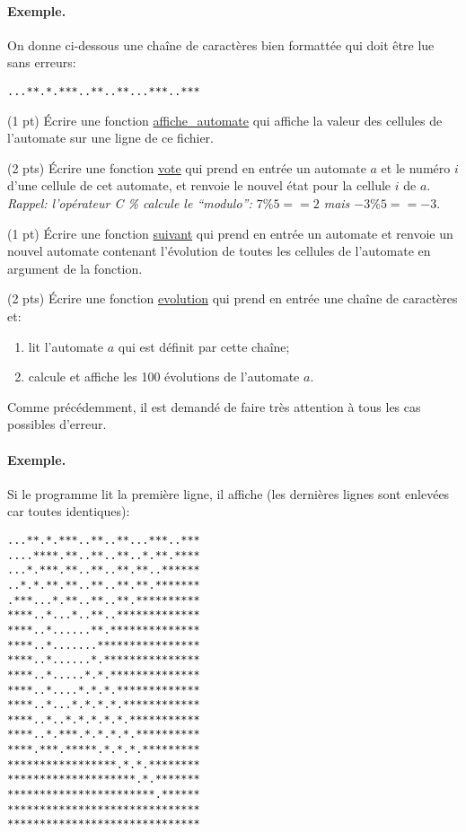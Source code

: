 \paragraph{Exemple.} On donne ci-dessous une chaîne de caractères bien
formatt{\'e}e qui doit {\^e}tre lue sans erreurs:
\begin{verbatim}
...**.*.***..**..**...***..***
\end{verbatim}

\question (1 pt) {\'E}crire une fonction \url{affiche_automate} qui
affiche la valeur des cellules de l'automate sur une ligne de ce fichier.


\question (2 pts) {\'E}crire une fonction \url{vote} qui prend en entr{\'e}e
un automate $a$ et le num{\'e}ro $i$ d'une cellule de cet automate, et
renvoie le nouvel {\'e}tat pour la cellule $i$ de $a$. \textit{Rappel: 
l'op{\'e}rateur C \% calcule le ``modulo'': $7\% 5 == 2$  mais \(-3 \% 5 == -3\)}.


\question (1 pt) {\'E}crire une fonction \url{suivant} qui prend en
entr{\'e}e un automate et renvoie un nouvel automate contenant
l'évolution de toutes les cellules de l'automate en argument de la fonction.


\question (2 pts) {\'E}crire une fonction \url{evolution} qui prend en
entr{\'e}e une chaîne de caractères et:
\begin{enumerate}
\item lit l'automate $a$ qui est d{\'e}finit par cette chaîne;
\item calcule et affiche les 100 {\'e}volutions de l'automate $a$.
\end{enumerate}
Comme pr{\'e}c{\'e}demment, il est demand{\'e} de faire tr{\`e}s
attention {\`a} tous les cas possibles d'erreur.


\paragraph{Exemple.} Si le programme lit la première ligne, il affiche
(les derni{\`e}res lignes sont enlev{\'e}es car toutes identiques):

\begin{verbatim}
...**.*.***..**..**...***..***
....****.**..**..**..*.**.****
...*.***.**..**..**.**..******
..*.*.**.**..**..**.**.*******
.***...*.**..**..**.**********
****..*...*..**..*************
****..*......**.**************
****..*.......****************
****..*......*.***************
****..*.....*.*.**************
****..*....*.*.*.*************
****..*...*.*.*.*.************
****..*..*.*.*.*.*.***********
****..*.***.*.*.*.*.**********
****.***.*****.*.*.*.*********
*****************.*.*.********
********************.*.*******
***********************.******
******************************
******************************
\end{verbatim}





